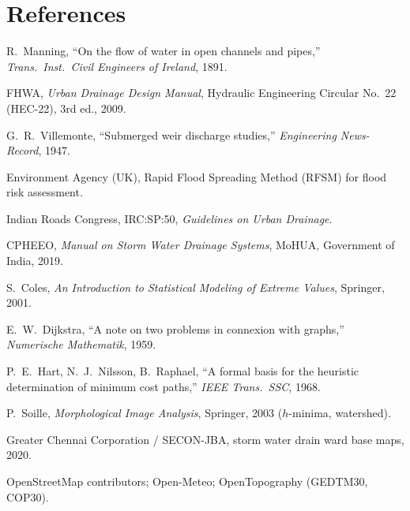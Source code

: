 \documentclass[11pt,a4paper]{article}
\begin{document}
\section*{References}
\begin{enumerate}[label={[\arabic*]},leftmargin=2em]
  \item R.~Manning, ``On the flow of water in open channels and pipes,''
        \emph{Trans.\ Inst.\ Civil Engineers of Ireland}, 1891.
  \item FHWA, \emph{Urban Drainage Design Manual}, Hydraulic Engineering Circular
        No.~22 (HEC-22), 3rd ed., 2009.
  \item G.~R.~Villemonte, ``Submerged weir discharge studies,''
        \emph{Engineering News-Record}, 1947.
  \item Environment Agency (UK), Rapid Flood Spreading Method (RFSM) for flood risk
        assessment.
  \item Indian Roads Congress, IRC:SP:50, \emph{Guidelines on Urban Drainage}.
  \item CPHEEO, \emph{Manual on Storm Water Drainage Systems}, MoHUA, Government of
        India, 2019.
  \item S.~Coles, \emph{An Introduction to Statistical Modeling of Extreme Values},
        Springer, 2001.
  \item E.~W.~Dijkstra, ``A note on two problems in connexion with graphs,''
        \emph{Numerische Mathematik}, 1959.
  \item P.~E.~Hart, N.~J.~Nilsson, B.~Raphael, ``A formal basis for the heuristic
        determination of minimum cost paths,'' \emph{IEEE Trans.\ SSC}, 1968.
  \item P.~Soille, \emph{Morphological Image Analysis}, Springer, 2003
        ($h$-minima, watershed).
  \item Greater Chennai Corporation / SECON-JBA, storm water drain ward base maps, 2020.
  \item OpenStreetMap contributors; Open-Meteo; OpenTopography (GEDTM30, COP30).
\end{enumerate}
\end{document}
